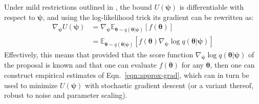 \documentclass[twocolumn,superscriptaddress,aps]{revtex4-1}
\newcommand{\bftheta}{{\bm \theta}}
\newcommand{\bfpsi}{{\bm \psi}}
\theoremstyle{plain}
\begin{document}
Under mild restrictions outlined in  \citep{2012arXiv1212.4507S}, the bound
$U(\bfpsi)$ is differentiable with respect to $\bfpsi$, and using the log-likelihood
trick its gradient can be rewritten as:
\begin{align}\label{eqn:approx-grad}
    \nabla_\bfpsi U(\bfpsi) &= \nabla_\bfpsi \mathbb{E}_{\bftheta \sim q(\bftheta|\bfpsi)} [f(\bftheta)] \nonumber \\
    &= \mathbb{E}_{\bftheta \sim q(\bftheta|\bfpsi)} [f(\bftheta) \nabla_\bfpsi \log q(\bftheta|\bfpsi)]
\end{align}
Effectively, this means that provided that the score function $\nabla_\bfpsi \log
q(\bftheta|\bfpsi)$ of the proposal is known and that one can evaluate
$f(\mathbf{\bftheta})$ for any $\bftheta$, then one can construct empirical
estimates of Eqn.~\ref{eqn:approx-grad}, which can in turn be used to minimize
$U(\bfpsi)$ with stochastic gradient descent (or a variant thereof, robust to noise
and parameter scaling).
\end{document}
